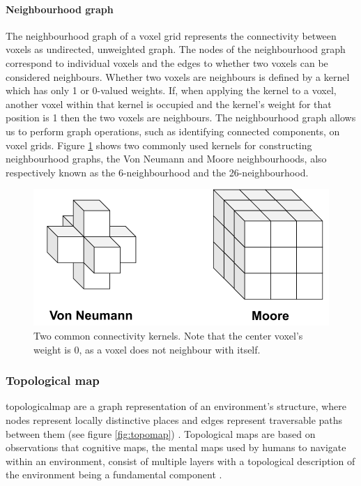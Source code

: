 \paragraph{Neighbourhood graph}

The neighbourhood graph of a voxel grid represents the connectivity between voxels as undirected, unweighted graph. The nodes of the neighbourhood graph correspond to individual voxels and the edges to whether two voxels can be considered neighbours. Whether two voxels are neighbours is defined by a kernel which has only 1 or 0-valued weights. If, when applying the kernel to a voxel, another voxel within that kernel is occupied and the kernel's weight for that position is 1 then the two voxels are neighbours. The neighbourhood graph allows us to perform graph operations, such as identifying connected components, on voxel grids. Figure \ref{fig:vg_nbs} shows two commonly used kernels for constructing neighbourhood graphs, the Von Neumann and Moore neighbourhoods, also respectively known as the 6-neighbourhood and the 26-neighbourhood.

\begin{figure}[h]
    \centering
    \includegraphics*[width=.7\textwidth]{./fig/voxel_neighbourhood.pdf}
    \caption{Two common connectivity kernels. Note that the center voxel's weight is 0, as a voxel does not neighbour with itself.}
    \label{fig:vg_nbs}
\end{figure}

\newpage


\subsubsection{Topological map}
\Gls{topologicalmap} are a graph representation of an environment's structure, where nodes represent locally distinctive places and edges represent traversable paths between them  (see figure \ref{fig:topomap}) \citep{thrun_learning_1998,kuipers_robust_1988}. Topological maps are based on observations that cognitive maps, the mental maps used by humans to navigate within an environment, consist of multiple layers with a topological description of the environment being a fundamental component \citep{kuipers_robust_1988,kuipers_modeling_1978}. 

